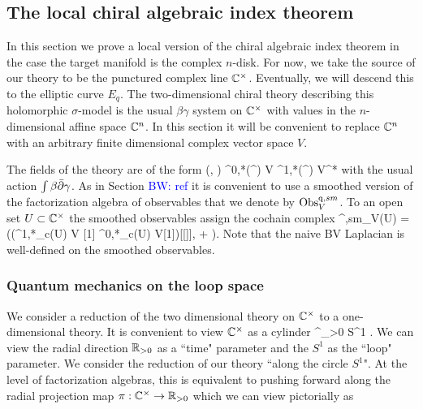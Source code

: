 \documentclass[10pt]{amsart}
\def\brian{\textcolor{blue}{BW: }\textcolor{blue}}
\begin{document}
\subsection{The local chiral algebraic index theorem}

In this section we prove a local version of the chiral algebraic index theorem in the case the target manifold is the complex $n$-disk. 
For now, we take the source of our theory to be the punctured complex line $\mathbb C^\times$.
Eventually, we will descend this to the elliptic curve $E_q$. 
The two-dimensional chiral theory describing this holomorphic $\sigma$-model is the usual $\beta\gamma$ system on $\mathbb C^\times$ with values in the $n$-dimensional affine space $\mathbb C^n$. 
In this section it will be convenient to replace $\mathbb C^n$ with an arbitrary finite dimensional complex vector space $V$. 

The fields of the theory are of the form
\ben
(\gamma, \beta) \in \Omega^{0,*}(\CC^\times) \tensor V \oplus \Omega^{1,*}(\CC^\times) \tensor V^*
\een
with the usual action $\int \beta \Bar{\partial} \gamma$. 
As in Section \brian{ref} it is convenient to use a smoothed version of the factorization algebra of observables that we denote by ${\rm Obs}_V^{{\rm q}, sm}$. 
To an open set $U \subset \mathbb C^\times$ the smoothed observables assign the cochain complex
\ben
{\Obs}^{\q,sm}_V(U) = (\cSym(\Omega^{1,*}_c(U) \otimes V [1] \oplus \Omega^{0,*}_c(U) \otimes V[1])[[\hbar]], \dbar + \hbar \Delta). 
\een
Note that the naive BV Laplacian is well-defined on the smoothed observables. 

\subsubsection{Quantum mechanics on the loop space}

We consider a reduction of the two dimensional theory on $\mathbb C^\times$ to a one-dimensional theory.
It is convenient to view $\mathbb C^\times$ as a cylinder
\ben
\CC^\times \cong \RR_{>0} \times S^1 .
\een
We can view the radial direction $\mathbb R_{>0}$ as a ``time" parameter and the $S^1$ as the ``loop" parameter. 
We consider the reduction of our theory ``along the circle $S^1$". 
At the level of factorization algebras, this is equivalent to pushing forward along the radial projection map $\pi : \mathbb C^\times \to \mathbb R_{>0}$ which we can view pictorially as
\ben
{}
\een
\end{document}
